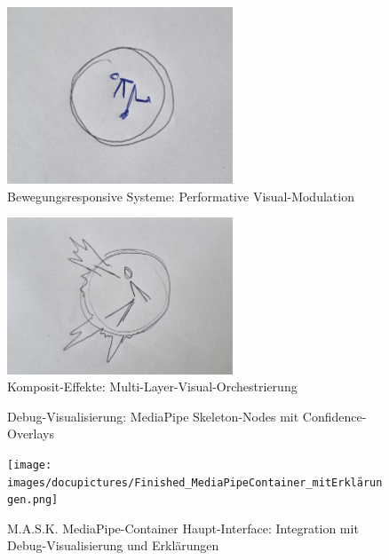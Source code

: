 \begin{figure}[!htbp]
    \centering
    \includegraphics[width=0.6\textwidth,height=0.25\textheight,keepaspectratio]{images/Sprint3_4.jpg}
    \caption{Bewegungsresponsive Systeme: Performative Visual-Modulation}
    \label{fig:movement_responsive}
\end{figure}

\begin{figure}[!htbp]
    \centering
    \includegraphics[width=0.6\textwidth,height=0.25\textheight,keepaspectratio]{images/Sprint3_5.jpg}
    \caption{Komposit-Effekte: Multi-Layer-Visual-Orchestrierung}
    \label{fig:composite_effects}
\end{figure}

\begin{figure}[!htbp]
    \centering
    \caption{Debug-Visualisierung: MediaPipe Skeleton-Nodes mit Confidence-Overlays}
    \label{fig:debug_viz}
\end{figure}

\begin{figure}[!htbp]
    \centering
    \texttt{[image: images/docupictures/Finished\_MediaPipeContainer\_mitErklärungen.png]}
    \caption{M.A.S.K. MediaPipe-Container Haupt-Interface: Integration mit Debug-Visualisierung und Erklärungen}
    \label{fig:main_interface}
\end{figure}

